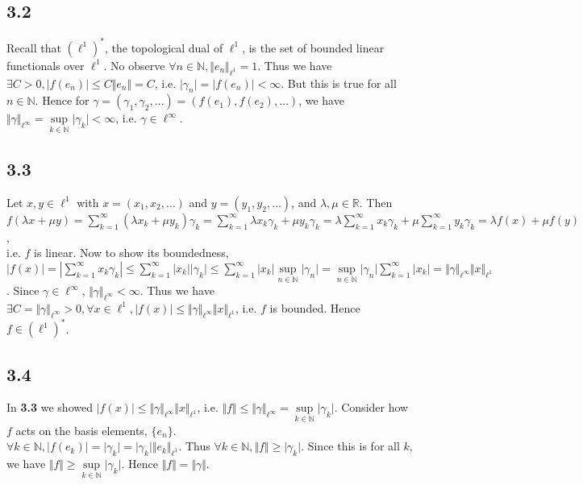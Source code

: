 \documentclass[12pt,a4paper]{article}
\newcommand{\N}{\mathbb{N}}
\newcommand{\R}{\mathbb{R}}
\theoremstyle{plain}
\theoremstyle{remark}
\theoremstyle{definition}
\begin{document}
\subsection*{3.2}
Recall that $(\ell^1)^*$, the topological dual of $\ell^1$, is the set of bounded linear functionals over $\ell^1$. No observe $\forall n \in \N, \Vert e_n \Vert_{\ell^1} = 1$. Thus we have\\
$\exists C > 0, \vert f(e_n) \vert \le C \Vert e_n \Vert = C$, i.e. $\vert \gamma_n \vert = \vert f(e_n) \vert < \infty$. But this is true for all $n \in \N$. Hence for $\gamma = (\gamma_1,\gamma_2,\ldots) = (f(e_1),f(e_2),\ldots)$, we have $\Vert \gamma \Vert_{\ell^{\infty}} = \sup\limits_{k \in \N} \vert \gamma_k \vert < \infty$, i.e. $\gamma \in \ell^{\infty}$.

\subsection*{3.3}
Let $x,y \in \ell^1$ with $x = (x_1,x_2,\ldots)$ and $y = (y_1,y_2,\ldots)$, and $\lambda,\mu \in \R$. Then\\
$f(\lambda x + \mu y) = \sum\limits_{k=1}^{\infty} (\lambda x_k + \mu y_k) \gamma_k = \sum\limits_{k=1}^{\infty} \lambda x_k \gamma_k + \mu y_k \gamma_k = \lambda \sum\limits_{k=1}^{\infty} x_k\gamma_k + \mu \sum\limits_{k=1}^{\infty} y_k \gamma_k = \lambda f(x) + \mu f(y)$,\\
i.e. $f$ is linear. Now to show its boundedness,\\
$\vert f(x) \vert = \left\vert \sum\limits_{k=1}^{\infty} x_k\gamma_k \right\vert \le \sum\limits_{k=1}^{\infty} \vert x_k \vert \vert \gamma_k \vert \le \sum\limits_{k=1}^{\infty} \vert x_k \vert \sup\limits_{n \in \N} \vert \gamma_n \vert = \sup\limits_{n \in \N} \vert \gamma_n \vert \sum\limits_{k=1}^{\infty} \vert x_k \vert = \Vert \gamma \Vert_{\ell^{\infty}} \Vert x \Vert_{\ell^1}$. Since $\gamma \in \ell^{\infty}$, $\Vert \gamma \Vert_{\ell^{\infty}} < \infty$. Thus we have\\
$\exists C = \Vert \gamma \Vert_{\ell^{\infty}} > 0, \forall x \in \ell^1, \vert f(x) \vert \le \Vert \gamma \Vert_{\ell^{\infty}}\Vert x \Vert_{\ell^1}$, i.e. $f$ is bounded. Hence $f \in (\ell^1)^*$.

\subsection*{3.4}
In \textbf{3.3} we showed $\vert f(x) \vert \le \Vert \gamma \Vert_{\ell^{\infty}} \Vert x \Vert_{\ell^1}$, i.e. $\Vert f \Vert \le \Vert \gamma \Vert_{\ell^{\infty}} = \sup\limits_{k \in \N} \vert \gamma_k \vert$. Consider how $f$ acts on the basis elements, $\{e_n\}$.\\
$\forall k \in \N, \vert f(e_k) \vert = \vert \gamma_k \vert = \vert \gamma_k \vert \Vert e_k \Vert_{\ell^1}$. Thus $\forall k \in \N, \Vert f \Vert \ge \vert \gamma_k \vert$. Since this is for all $k$, we have $\Vert f \Vert \ge \sup\limits_{k \in \N} \vert \gamma_k \vert$. Hence $\Vert f \Vert = \Vert \gamma \Vert$.
\end{document}
